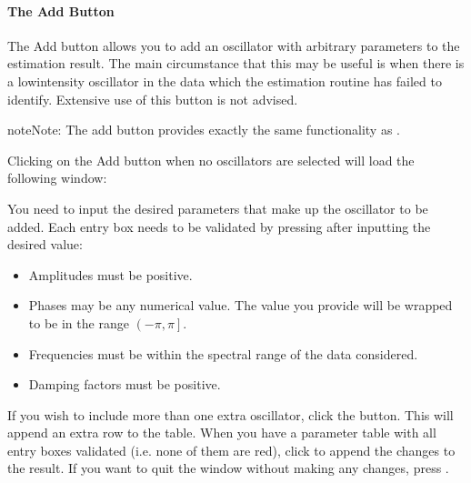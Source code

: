 \documentclass[letterpaper,10pt,english]{sphinxmanual}
\begin{document}
\paragraph{The Add Button}
\label{\detokenize{gui/usage/result:the-add-button}}
\sphinxAtStartPar
The Add button allows you to add an oscillator with arbitrary parameters to
the estimation result. The main circumstance that this may be useful is when
there is a low\sphinxhyphen{}intensity oscillator in the data which the estimation routine
has failed to identify. Extensive use of this button is not advised.

\begin{sphinxadmonition}{note}{Note:}
\sphinxAtStartPar
The add button provides exactly the same functionality as
{\hyperref[\detokenize{references/core:nmrespy.core.Estimator.add_oscillators}]{}}.
\end{sphinxadmonition}

\sphinxAtStartPar
Clicking on the Add button when no oscillators are selected will load the
following window:


\sphinxAtStartPar
You need to input the desired parameters that make up the oscillator to be
added. Each entry box needs to be validated by pressing  after
inputting the desired value:
\begin{itemize}
\item {} 
\sphinxAtStartPar
Amplitudes must be positive.

\item {} 
\sphinxAtStartPar
Phases may be any numerical value. The value you provide will be wrapped
to be in the range \(\left(-\pi, \pi\right]\).

\item {} 
\sphinxAtStartPar
Frequencies must be within the spectral range of the data considered.

\item {} 
\sphinxAtStartPar
Damping factors must be positive.

\end{itemize}

\sphinxAtStartPar
If you wish to include more than one extra oscillator, click the  button.
This will append an extra row to the table. When you have a parameter table
with all entry boxes validated (i.e. none of them are red), click 
to append the changes to the result. If you want to quit the window without
making any changes, press .
\end{document}

